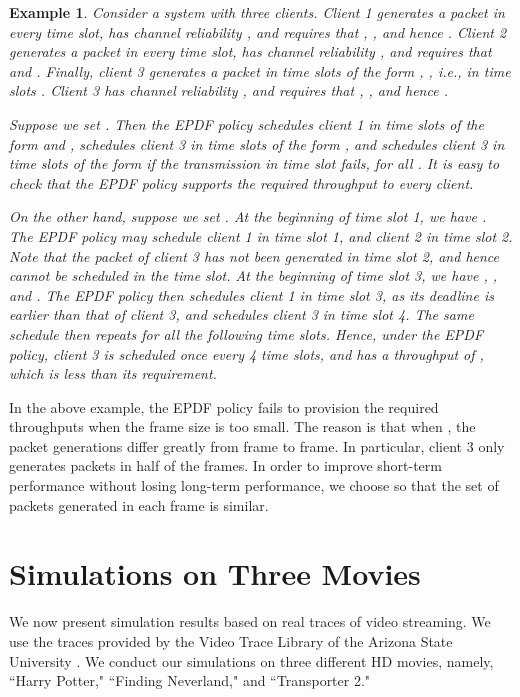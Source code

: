 \documentclass[10pt,nocopyrightspace]{sigplan-proc-varsize-1in}
\newtheorem{example}{Example}
\begin{document}
\begin{example}	\label{example:smallM}
Consider a system with three clients. Client 1 generates a packet in every time slot, has channel reliability , and requires that , , and hence . Client 2 generates a packet in every time slot, has channel reliability , and requires that  and . Finally, client 3 generates a packet in time slots of the form , , i.e., in time slots . Client 3 has channel reliability , and requires that , , and hence .

Suppose we set . Then the EPDF policy schedules client 1 in time slots of the form  and , schedules client 3 in time slots of the form , and schedules client 3 in time slots of the form  if the transmission in time slot  fails, for all . It is easy to check that the EPDF policy supports the required throughput to every client.

On the other hand, suppose we set . At the beginning of time slot 1, we have . The EPDF policy may schedule client 1 in time slot 1, and client 2 in time slot 2. Note that the packet of client 3 has not been generated in time slot 2, and hence cannot be scheduled in the time slot. At the beginning of time slot 3, we have , , and . The EPDF policy then schedules client 1 in time slot 3, as its deadline is earlier than that of client 3, and schedules client 3 in time slot 4. The same schedule then repeats for all the following time slots. Hence, under the EPDF policy, client 3 is scheduled once every 4 time slots, and has a throughput of , which is less than its requirement. 
\end{example}

In the above example, the EPDF policy fails to provision the required throughputs when the frame size  is too small. The reason is that when , the packet generations differ greatly from frame to frame. In particular, client 3 only generates packets in half of the frames. In order to improve short-term performance without losing long-term performance, we choose  so that the set of packets generated in each frame is similar.

\section{Simulations on Three Movies}  \label{section:simulations}

We now present simulation results based on real traces of video streaming. We use the traces provided by the Video Trace Library of the Arizona State University \cite{SeRe12,traces2}. We conduct our simulations on three different HD movies, namely, ``Harry Potter," ``Finding Neverland," and ``Transporter 2."
\end{document}
